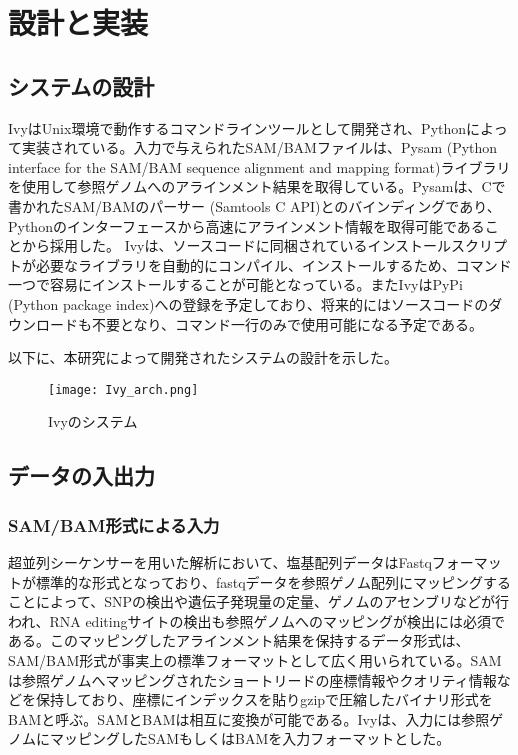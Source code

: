 \section{設計と実装}
\subsection{システムの設計}
IvyはUnix環境で動作するコマンドラインツールとして開発され、Pythonによって実装されている。入力で与えられたSAM/BAMファイルは、Pysam (Python interface for the SAM/BAM sequence alignment and mapping format)ライブラリを使用して参照ゲノムへのアラインメント結果を取得している。Pysamは、Cで書かれたSAM/BAMのパーサー (Samtools C API)とのバインディングであり、Pythonのインターフェースから高速にアラインメント情報を取得可能であることから採用した。
Ivyは、ソースコードに同梱されているインストールスクリプトが必要なライブラリを自動的にコンパイル、インストールするため、コマンド一つで容易にインストールすることが可能となっている。またIvyはPyPi (Python package index)への登録を予定しており、将来的にはソースコードのダウンロードも不要となり、コマンド一行のみで使用可能になる予定である。
\par
以下に、本研究によって開発されたシステムの設計を示した。
\begin{figure}[htbp]
	\begin{center}
		\texttt{[image: Ivy\_arch.png]}
	\end{center}
	\vspace*{-1cm}
	\caption{Ivyのシステム}
\end{figure}

\subsection{データの入出力}
\subsubsection{SAM/BAM形式による入力}
超並列シーケンサーを用いた解析において、塩基配列データはFastqフォーマットが標準的な形式となっており、fastqデータを参照ゲノム配列にマッピングすることによって、SNPの検出や遺伝子発現量の定量、ゲノムのアセンブリなどが行われ、RNA editingサイトの検出も参照ゲノムへのマッピングが検出には必須である。このマッピングしたアラインメント結果を保持するデータ形式は、SAM/BAM形式が事実上の標準フォーマットとして広く用いられている。SAMは参照ゲノムへマッピングされたショートリードの座標情報やクオリティ情報などを保持しており、座標にインデックスを貼りgzipで圧縮したバイナリ形式をBAMと呼ぶ。SAMとBAMは相互に変換が可能である。Ivyは、入力には参照ゲノムにマッピングしたSAMもしくはBAMを入力フォーマットとした。

